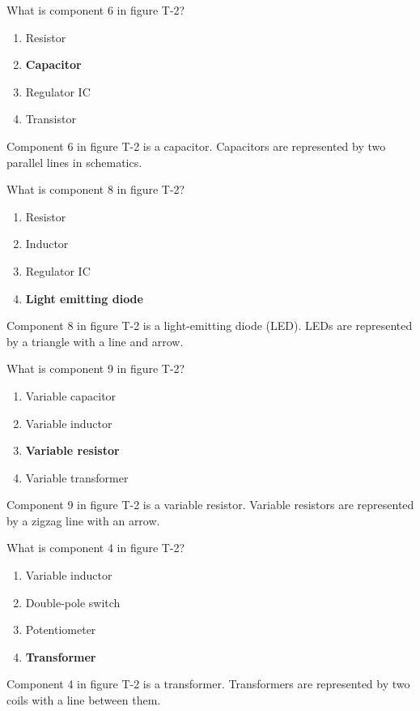 \begin{tcolorbox}[colback=gray!10!white,colframe=black!75!black,title={T6C06}]
    What is component 6 in figure T-2?
    \begin{enumerate}[label=\Alph*),noitemsep]
        \item Resistor
        \item \textbf{Capacitor}
        \item Regulator IC
        \item Transistor
    \end{enumerate}
\end{tcolorbox}
Component 6 in figure T-2 is a capacitor. Capacitors are represented by two parallel lines in schematics.

\begin{tcolorbox}[colback=gray!10!white,colframe=black!75!black,title={T6C07}]
    What is component 8 in figure T-2?
    \begin{enumerate}[label=\Alph*),noitemsep]
        \item Resistor
        \item Inductor
        \item Regulator IC
        \item \textbf{Light emitting diode}
    \end{enumerate}
\end{tcolorbox}
Component 8 in figure T-2 is a light-emitting diode (LED). LEDs are represented by a triangle with a line and arrow.

\begin{tcolorbox}[colback=gray!10!white,colframe=black!75!black,title={T6C08}]
    What is component 9 in figure T-2?
    \begin{enumerate}[label=\Alph*),noitemsep]
        \item Variable capacitor
        \item Variable inductor
        \item \textbf{Variable resistor}
        \item Variable transformer
    \end{enumerate}
\end{tcolorbox}
Component 9 in figure T-2 is a variable resistor. Variable resistors are represented by a zigzag line with an arrow.

\begin{tcolorbox}[colback=gray!10!white,colframe=black!75!black,title={T6C09}]
    What is component 4 in figure T-2?
    \begin{enumerate}[label=\Alph*),noitemsep]
        \item Variable inductor
        \item Double-pole switch
        \item Potentiometer
        \item \textbf{Transformer}
    \end{enumerate}
\end{tcolorbox}
Component 4 in figure T-2 is a transformer. Transformers are represented by two coils with a line between them.

